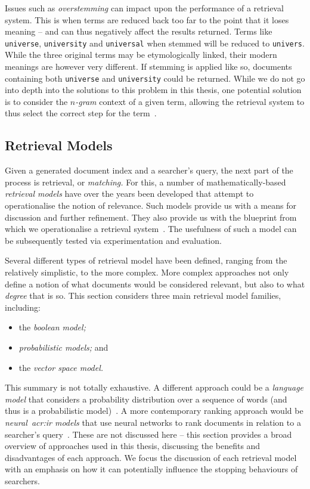 Issues such as \emph{overstemming} can impact upon the performance of a retrieval system. This is when terms are reduced back too far to the point that it loses meaning -- and can thus negatively affect the results returned. Terms like \texttt{universe}, \texttt{university} and \texttt{universal} when stemmed will be reduced to \texttt{univers}. While the three original terms may be etymologically linked, their modern meanings are however very different. If stemming is applied like so, documents containing both \texttt{universe} and \texttt{university} could be returned. While we do not go into depth into the solutions to this problem in this thesis, one potential solution is to consider the \emph{$n$-gram} context of a given term, allowing the retrieval system to thus select the correct step for the term~\citep{mcnamee2005stemminggrams}.

\subsection{Retrieval Models}\label{sec:ir_background:basics:models}
Given a generated document index and a searcher's query, the next part of the process is retrieval, or \emph{matching.} For this, a number of mathematically-based \emph{retrieval models} have over the years been developed that attempt to operationalise the notion of relevance. Such models provide us with a means for discussion and further refinement. They also provide us with the blueprint from which we operationalise a retrieval system~\citep{hiemstra2009ir_models}. The usefulness of such a model can be subsequently tested via experimentation and evaluation.

Several different types of retrieval model have been defined, ranging from the relatively simplistic, to the more complex. More complex approaches not only define a notion of what documents would be considered relevant, but also to what \emph{degree} that is so. This section considers three main retrieval model families, including:

\begin{itemize}
    \item{the \emph{boolean model;}}
    \item{\emph{probabilistic models;} and}
    \item{the \emph{vector space model.}}
\end{itemize}

This summary is not totally exhaustive. A different approach could be a \emph{language model} that considers a probability distribution over a sequence of words (and thus is a probabilistic model)~\citep{manning2008ir}. A more contemporary ranking approach would be \emph{neural~\gls{acr:ir} models} that use neural networks to rank documents in relation to a searcher's query~\citep{mitra2017neural_ir}. These are not discussed here -- this section provides a broad overview of approaches used in this thesis, discussing the benefits and disadvantages of each approach. We focus the discussion of each retrieval model with an emphasis on how it can potentially influence the stopping behaviours of searchers.

